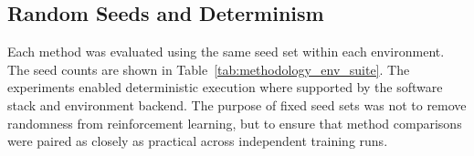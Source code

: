 \subsection{Random Seeds and Determinism}
\label{subsec:methodology_random_seeds_and_determinism}

Each method was evaluated using the same seed set within each environment.
The seed counts are shown in Table~\ref{tab:methodology_env_suite}.
The experiments enabled deterministic execution where supported by the software stack and environment backend.
The purpose of fixed seed sets was not to remove randomness from reinforcement learning, but to ensure that method comparisons were paired as closely as practical across independent training runs.